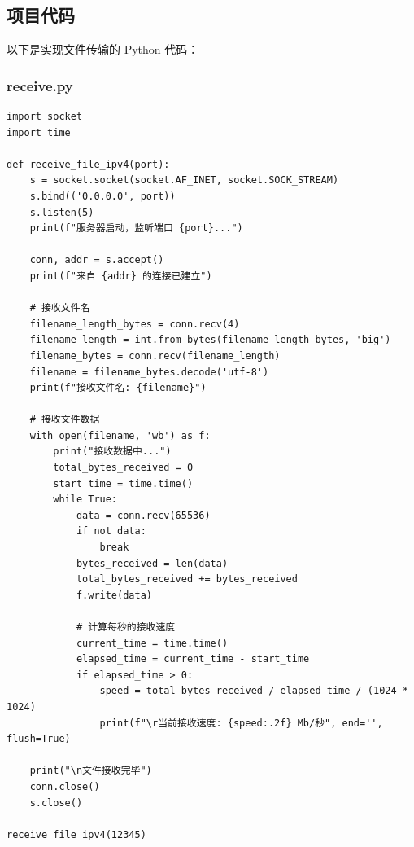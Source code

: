 \documentclass[UTF8,titlepage]{ctexart}
\numberwithin{figure}{section}
\begin{document}
\subsection{项目代码}
以下是实现文件传输的 Python 代码：

\subsubsection{receive.py}
\begin{verbatim}
import socket
import time

def receive_file_ipv4(port):
    s = socket.socket(socket.AF_INET, socket.SOCK_STREAM)
    s.bind(('0.0.0.0', port))
    s.listen(5)
    print(f"服务器启动，监听端口 {port}...")

    conn, addr = s.accept()
    print(f"来自 {addr} 的连接已建立")

    # 接收文件名
    filename_length_bytes = conn.recv(4)
    filename_length = int.from_bytes(filename_length_bytes, 'big')
    filename_bytes = conn.recv(filename_length)
    filename = filename_bytes.decode('utf-8')
    print(f"接收文件名: {filename}")

    # 接收文件数据
    with open(filename, 'wb') as f:
        print("接收数据中...")
        total_bytes_received = 0
        start_time = time.time()
        while True:
            data = conn.recv(65536)
            if not data:
                break
            bytes_received = len(data)
            total_bytes_received += bytes_received
            f.write(data)

            # 计算每秒的接收速度
            current_time = time.time()
            elapsed_time = current_time - start_time
            if elapsed_time > 0:
                speed = total_bytes_received / elapsed_time / (1024 * 1024)
                print(f"\r当前接收速度: {speed:.2f} Mb/秒", end='', flush=True)

    print("\n文件接收完毕")
    conn.close()
    s.close()

receive_file_ipv4(12345)
\end{verbatim}
\end{document}
